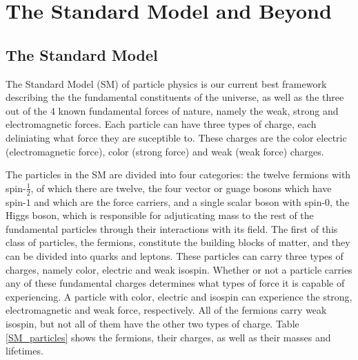 \chapter{The Standard Model and Beyond}
\section{The Standard Model}

% 


The Standard Model (SM) of particle physics is our current best framework describing the the fundamental constituents of the universe, as well as the three out of the 4 known fundamental forces of nature, namely the weak, strong and electromagnetic forces. Each particle can have three types of charge, each deliniating what force they are suceptible to. These charges are the color electric (electromagnetic force), color (strong force) and weak (weak force) charges.

The particles in the SM are divided into four categories: the twelve fermions with spin-$\frac12$, of which there are twelve, the four vector or guage bosons which have spin-$1$ and which are the force carriers, and a single scalar boson with spin-$0$, the Higgs boson, which is responsible for adjuticating mass to the rest of the fundamental particles through their interactions with its field. The first of this class of particles, the fermions, constitute the building blocks of matter, and they can be divided into quarks and leptons. These particles can carry three types of charges, namely color, electric and weak isospin. Whether or not a particle carries any of these fundamental charges determines what types of force it is capable of experiencing. A particle with color, electric and isospin can experience the strong, electromagnetic and weak force, respectively. All of the fermions carry weak isospin, but not all of them have the other two types of charge. Table \ref{SM_particles} shows the fermions, their charges, as well as their masses and lifetimes.





